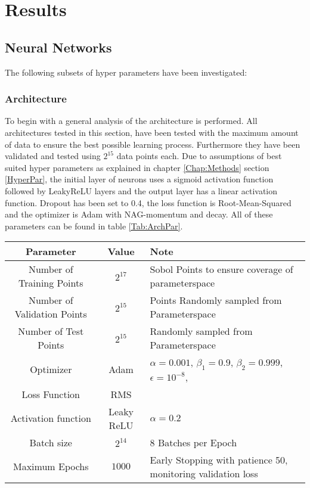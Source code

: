 \chapter{Results}
	\label{Chap:Results}
	\section{Neural Networks}
		The following subsets of hyper parameters have been investigated:
		\subsection{Architecture}
			To begin with a general analysis of the architecture is performed. All architectures tested in this section, have been tested with the maximum amount of data to ensure the best possible learning process. Furthermore they have been validated and tested using $2^{15}$ data points each. Due to assumptions of best suited hyper parameters as explained in chapter \ref{Chap:Methods} section \ref{HyperPar}, the initial layer of neurons uses a sigmoid activation function followed by LeakyReLU layers and the output layer has a linear activation function. Dropout has been set to 0.4, the loss function is Root-Mean-Squared and the optimizer is Adam with NAG-momentum and decay. All of these parameters can be found in table \ref{Tab:ArchPar}.\\
			\begin{tabularx}{\textwidth}{c|c|X}
				Parameter & Value & Note\\
				\hline
				Number of Training Points & $2^{17}$ & Sobol Points to ensure coverage of parameterspace\\
				Number of Validation Points & $2^{15}$ & Points Randomly sampled from Parameterspace \\
				Number of Test Points & $2^{15}$ & Randomly sampled from Parameterspace\\
				Optimizer & Adam & $\alpha = 0.001$, $\beta_1 = 0.9$, $\beta_2 = 0.999$, $\epsilon = 10^{-8}$, \\
				Loss Function & RMS & \\
				Activation function & Leaky ReLU & $\alpha = 0.2$\\
				Batch size & $2^{14}$ & 8 Batches per Epoch\\
				Maximum Epochs & $1000$ & Early Stopping with patience 50, monitoring validation loss\\
			\end{tabularx}
			
